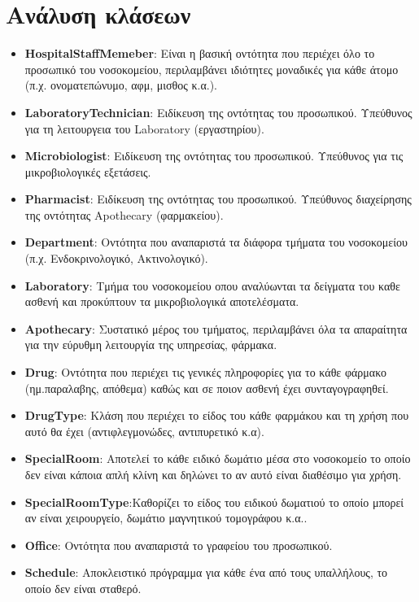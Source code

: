 \documentclass{article}
\begin{document}
\section{Ανάλυση κλάσεων}

\begin{itemize}
    \item \textbf{HospitalStaffMemeber}: Είναι η βασική οντότητα που περιέχει όλο το προσωπικό του νοσοκομείου, περιλαμβάνει ιδιότητες μοναδικές για κάθε άτομο (π.χ. ονοματεπώνυμο, αφμ, μισθος κ.α.).
    \item \textbf{LaboratoryTechnician}: Ειδίκευση της οντότητας του προσωπικού. Υπεύθυνος για τη λειτουργεια του Laboratory (εργαστηρίου).
    \item \textbf{Microbiologist}: Ειδίκευση της οντότητας του προσωπικού. Υπεύθυνος για τις μικροβιολογικές εξετάσεις.
    \item \textbf{Pharmacist}: Ειδίκευση της οντότητας του προσωπικού. Υπεύθυνος διαχείρησης της οντότητας Apothecary (φαρμακείου).
    \item \textbf{Department}: Οντότητα που αναπαριστά τα διάφορα τμήματα του νοσοκομείου (π.χ. Ενδοκρινολογικό, Ακτινολογικό).
    \item \textbf{Laboratory}: Τμήμα του νοσοκομείου οπου αναλύωνται τα δείγματα του καθε ασθενή και προκύπτουν τα μικροβιολογικά αποτελέσματα. 
    \item \textbf{Apothecary}: Συστατικό μέρος του τμήματος, περιλαμβάνει όλα τα απαραίτητα για την εύρυθμη λειτουργία της υπηρεσίας, φάρμακα.
    \item \textbf{Drug}: Οντότητα που περιέχει τις γενικές πληροφορίες για το κάθε φάρμακο (ημ.παραλαβης, απόθεμα) καθώς και σε ποιον ασθενή έχει συνταγογραφηθεί.
    \item \textbf{DrugType}: Κλάση που περιέχει το είδος του κάθε φαρμάκου και τη χρήση που αυτό θα έχει (αντιφλεγμονώδες, αντιπυρετικό κ.α).
    \item \textbf{SpecialRoom}: Αποτελεί το κάθε ειδικό δωμάτιο μέσα στο νοσοκομείο το οποίο δεν είναι κάποια απλή κλίνη και δηλώνει το αν αυτό είναι διαθέσιμο για χρήση.
    \item \textbf{SpecialRoomType}:Καθορίζει το είδος του ειδικού δωματιού το οποίο μπορεί αν είναι χειρουργείο, δωμάτιο μαγνητικού τομογράφου κ.α..
    \item \textbf{Office}: Οντότητα που αναπαριστά το γραφείου του προσωπικού.
    \item \textbf{Schedule}: Αποκλειστικό πρόγραμμα για κάθε ένα από τους υπαλλήλους, το οποίο δεν είναι σταθερό.

\end{itemize}
\end{document}
